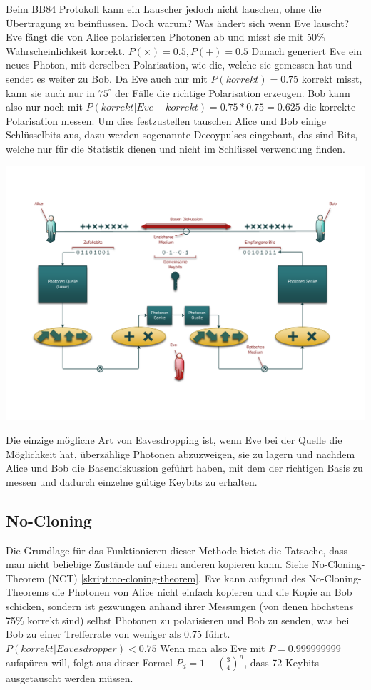   Beim BB84 Protokoll kann ein Lauscher jedoch nicht lauschen, ohne die \"Ubertragung zu beinflussen.
  Doch warum? Was \"andert sich wenn Eve lauscht?
  Eve f\"angt die von Alice polarisierten Photonen ab und misst sie mit 50\% Wahrscheinlichkeit korrekt.
  $P(\times)=0.5, P(+)=0.5$
  Danach generiert Eve ein neues Photon, mit derselben Polarisation,
  wie die, welche sie gemessen hat und sendet es weiter zu Bob.
  Da Eve auch nur mit $P(korrekt)=0.75$ korrekt misst, kann sie auch nur in $75^{\circ}$ der F\"alle die richtige Polarisation erzeugen.
  Bob kann also nur noch mit $P(korrekt|Eve-korrekt)=0.75*0.75=0.625$ die korrekte Polarisation messen.
  Um dies festzustellen tauschen Alice und Bob einige Schl\"usselbits aus,
  dazu werden sogenannte Decoypulses eingebaut, das sind Bits,
  welche nur f\"ur die Statistik dienen und nicht im Schl\"ussel verwendung finden.

  \includegraphics[width=\textwidth]{crypto/BB84Eve.pdf}

  Die einzige m\"ogliche Art von Eavesdropping ist, wenn Eve bei der Quelle die M\"oglichkeit hat, \"uberz\"ahlige Photonen abzuzweigen, sie zu lagern und nachdem Alice und Bob die Basendiskussion gef\"uhrt haben, mit dem der richtigen Basis zu messen und dadurch einzelne g\"ultige Keybits zu erhalten.

  \subsection{No-Cloning}
  Die Grundlage f\"ur das Funktionieren dieser Methode bietet die Tatsache, dass man nicht beliebige Zust\"ande auf einen anderen kopieren kann. Siehe No-Cloning-Theorem (NCT) \ref{skript:no-cloning-theorem}.
  Eve kann aufgrund des No-Cloning-Theorems die Photonen von Alice nicht einfach kopieren und die Kopie an Bob schicken,
  sondern ist gezwungen anhand ihrer Messungen (von denen h\"ochstens 75\% korrekt sind) selbst Photonen zu polarisieren
  und Bob zu senden, was bei Bob zu einer Trefferrate von weniger als 0.75 f\"uhrt.
  $P(korrekt|Eavesdropper)<0.75$
  Wenn man also Eve mit $P=0.999999999$ aufsp\"uren will,
  folgt aus dieser Formel $P_d = 1 - \left(\frac{3}{4}\right)^n$,
  dass 72 Keybits ausgetauscht werden m\"ussen.

